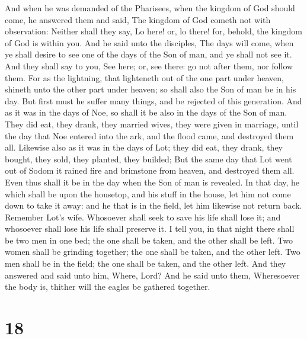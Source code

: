  And when he was demanded of the Pharisees, when the
kingdom of God should come, he answered them and said, The kingdom of
God cometh not with observation:  Neither shall they say,
Lo here! or, lo there! for, behold, the kingdom of God is within you.
 And he said unto the disciples, The days will come, when
ye shall desire to see one of the days of the Son of man, and ye shall
not see it.  And they shall say to you, See here; or, see
there: go not after them, nor follow them.  For as the
lightning, that lighteneth out of the one part under heaven, shineth
unto the other part under heaven; so shall also the Son of man be in his
day.  But first must he suffer many things, and be
rejected of this generation.  And as it was in the days
of Noe, so shall it be also in the days of the Son of man.
 They did eat, they drank, they married wives, they were
given in marriage, until the day that Noe entered into the ark, and the
flood came, and destroyed them all.  Likewise also as it
was in the days of Lot; they did eat, they drank, they bought, they
sold, they planted, they builded;  But the same day that
Lot went out of Sodom it rained fire and brimstone from heaven, and
destroyed them all.  Even thus shall it be in the day
when the Son of man is revealed.  In that day, he which
shall be upon the housetop, and his stuff in the house, let him not come
down to take it away: and he that is in the field, let him likewise not
return back.  Remember Lot's wife. 
Whosoever shall seek to save his life shall lose it; and whosoever shall
lose his life shall preserve it.  I tell you, in that
night there shall be two men in one bed; the one shall be taken, and the
other shall be left.  Two women shall be grinding
together; the one shall be taken, and the other left. 
Two men shall be in the field; the one shall be taken, and the other
left.  And they answered and said unto him, Where, Lord?
And he said unto them, Wheresoever the body is, thither will the eagles
be gathered together.

\hypertarget{section-17}{%
\section{18}\label{section-17}}

